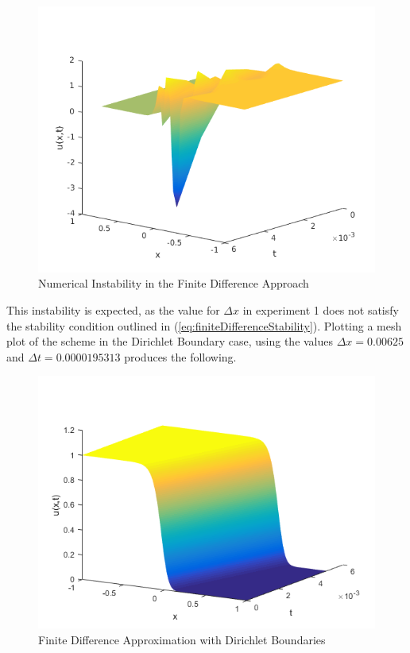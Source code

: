 \documentclass[a4paper]{article}
\begin{document}
    \begin{figure}[H]
    \caption{Numerical Instability in the Finite Difference Approach}
    \includegraphics[scale=0.5]{Fisher_Dirichlet_NumericalInstability.png}
    \end{figure}
    This instability is expected, as the value for $\Delta x$ in experiment 1 does not satisfy the stability condition outlined in (\ref{eq:finiteDifferenceStability}).
    \newline
    Plotting a mesh plot of the scheme in the Dirichlet Boundary case, using the values $\Delta x = 0.00625$ and $\Delta t = 0.0000195313$ produces the following.
    \begin{figure}[H]
    \caption{Finite Difference Approximation with Dirichlet Boundaries}
    \includegraphics[scale=0.7]{Fisher_Dirichlet_FiniteDifference.png}
    \end{figure}
\end{document}
